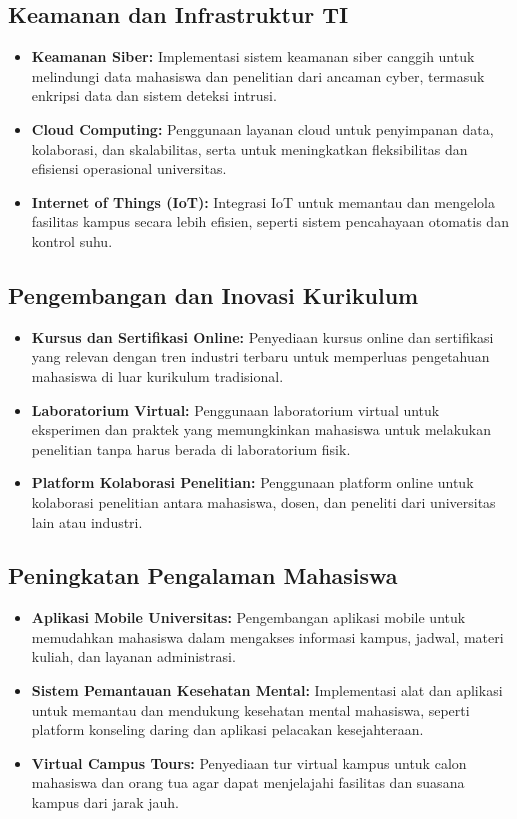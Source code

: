 \subsection{Keamanan dan Infrastruktur TI}
\begin{itemize}
	\item \textbf{Keamanan Siber:} Implementasi sistem keamanan siber canggih untuk melindungi data mahasiswa dan penelitian dari ancaman cyber, termasuk enkripsi data dan sistem deteksi intrusi.
	\item \textbf{Cloud Computing:} Penggunaan layanan cloud untuk penyimpanan data, kolaborasi, dan skalabilitas, serta untuk meningkatkan fleksibilitas dan efisiensi operasional universitas.
	\item \textbf{Internet of Things (IoT):} Integrasi IoT untuk memantau dan mengelola fasilitas kampus secara lebih efisien, seperti sistem pencahayaan otomatis dan kontrol suhu.
\end{itemize}

\subsection{Pengembangan dan Inovasi Kurikulum}
\begin{itemize}
	\item \textbf{Kursus dan Sertifikasi Online:} Penyediaan kursus online dan sertifikasi yang relevan dengan tren industri terbaru untuk memperluas pengetahuan mahasiswa di luar kurikulum tradisional.
	\item \textbf{Laboratorium Virtual:} Penggunaan laboratorium virtual untuk eksperimen dan praktek yang memungkinkan mahasiswa untuk melakukan penelitian tanpa harus berada di laboratorium fisik.
	\item \textbf{Platform Kolaborasi Penelitian:} Penggunaan platform online untuk kolaborasi penelitian antara mahasiswa, dosen, dan peneliti dari universitas lain atau industri.
\end{itemize}

\subsection{Peningkatan Pengalaman Mahasiswa}
\begin{itemize}
	\item \textbf{Aplikasi Mobile Universitas:} Pengembangan aplikasi mobile untuk memudahkan mahasiswa dalam mengakses informasi kampus, jadwal, materi kuliah, dan layanan administrasi.
	\item \textbf{Sistem Pemantauan Kesehatan Mental:} Implementasi alat dan aplikasi untuk memantau dan mendukung kesehatan mental mahasiswa, seperti platform konseling daring dan aplikasi pelacakan kesejahteraan.
	\item \textbf{Virtual Campus Tours:} Penyediaan tur virtual kampus untuk calon mahasiswa dan orang tua agar dapat menjelajahi fasilitas dan suasana kampus dari jarak jauh.
\end{itemize}

